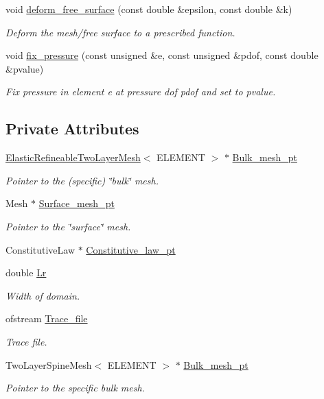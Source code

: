 \begin{DoxyCompactItemize}
void \hyperlink{classInterfaceProblem_aa93d492461ac53f0d9f88516bce322dc}{deform\+\_\+free\+\_\+surface} (const double \&epsilon, const double \&k)
\begin{DoxyCompactList}\small\item\em Deform the mesh/free surface to a prescribed function. \end{DoxyCompactList}\item 
void \hyperlink{classInterfaceProblem_a9d1a04da451b6f41336cb6f3bd910633}{fix\+\_\+pressure} (const unsigned \&e, const unsigned \&pdof, const double \&pvalue)
\begin{DoxyCompactList}\small\item\em Fix pressure in element e at pressure dof pdof and set to pvalue. \end{DoxyCompactList}\end{DoxyCompactItemize}
\subsection*{Private Attributes}
\begin{DoxyCompactItemize}
\item 
\hyperlink{classElasticRefineableTwoLayerMesh}{Elastic\+Refineable\+Two\+Layer\+Mesh}$<$ E\+L\+E\+M\+E\+NT $>$ $\ast$ \hyperlink{classInterfaceProblem_ad7cdca485f230393096667bf0709ef8d}{Bulk\+\_\+mesh\+\_\+pt}
\begin{DoxyCompactList}\small\item\em Pointer to the (specific) \char`\"{}bulk\char`\"{} mesh. \end{DoxyCompactList}\item 
Mesh $\ast$ \hyperlink{classInterfaceProblem_a011c7b4f2307ff909f64dc158e8fc674}{Surface\+\_\+mesh\+\_\+pt}
\begin{DoxyCompactList}\small\item\em Pointer to the \char`\"{}surface\char`\"{} mesh. \end{DoxyCompactList}\item 
Constitutive\+Law $\ast$ \hyperlink{classInterfaceProblem_a5bf645cbdbf7775ab6438be324caf3c3}{Constitutive\+\_\+law\+\_\+pt}
\item 
double \hyperlink{classInterfaceProblem_a6ebe4e37868be26465c7bc6d2cef95e7}{Lr}
\begin{DoxyCompactList}\small\item\em Width of domain. \end{DoxyCompactList}\item 
ofstream \hyperlink{classInterfaceProblem_a45e3bf3b44bcbeefab21a3598bef6179}{Trace\+\_\+file}
\begin{DoxyCompactList}\small\item\em Trace file. \end{DoxyCompactList}\item 
Two\+Layer\+Spine\+Mesh$<$ E\+L\+E\+M\+E\+NT $>$ $\ast$ \hyperlink{classInterfaceProblem_a1e9cf118e6c477ea9a1a49610bb72174}{Bulk\+\_\+mesh\+\_\+pt}
\begin{DoxyCompactList}\small\item\em Pointer to the specific bulk mesh. \end{DoxyCompactList}\end{DoxyCompactItemize}



